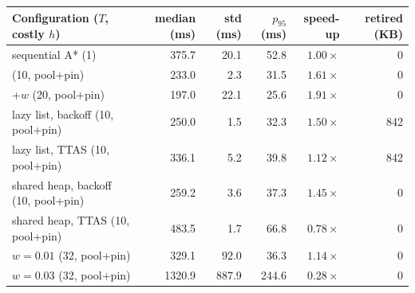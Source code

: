 \begin{tabular}{lrrrrr}
\toprule
Configuration ($T$, costly $h$) & median (ms) & std (ms) & $p_{95}$ (ms) & speed-up & retired (KB) \\
\midrule
sequential A* (1) & 375.7 & 20.1 & 52.8 & $1.00\times$ & 0 \\
\HDA{} (10, pool+pin) & 233.0 & 2.3 & 31.5 & $1.61\times$ & 0 \\
\HDA{}+$w$ (20, pool+pin) & 197.0 & 22.1 & 25.6 & $1.91\times$ & 0 \\
lazy list, backoff (10, pool+pin) & 250.0 & 1.5 & 32.3 & $1.50\times$ & 842 \\
lazy list, TTAS (10, pool+pin) & 336.1 & 5.2 & 39.8 & $1.12\times$ & 842 \\
shared heap, backoff (10, pool+pin) & 259.2 & 3.6 & 37.3 & $1.45\times$ & 0 \\
shared heap, TTAS (10, pool+pin) & 483.5 & 1.7 & 66.8 & $0.78\times$ & 0 \\
\HDA{} $w=0.01$ (32, pool+pin) & 329.1 & 92.0 & 36.3 & $1.14\times$ & 0 \\
\HDA{} $w=0.03$ (32, pool+pin) & 1320.9 & 887.9 & 244.6 & $0.28\times$ & 0 \\
\bottomrule
\end{tabular}

